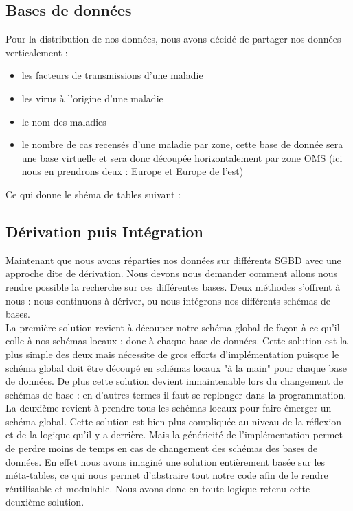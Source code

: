 \documentclass[12pt]{article}
\begin{document}
\subsection{Bases de données}

	Pour la distribution de nos données, nous avons décidé de partager nos données verticalement :\\
	\begin{itemize}
		\item les facteurs de transmissions d'une maladie\\
		\item les virus à l'origine d'une maladie\\
		\item le nom des maladies\\
		\item le nombre de cas recensés d'une maladie par zone, cette base de donnée sera une base virtuelle et sera donc découpée horizontalement par zone OMS (ici nous en prendrons deux : Europe et Europe de l'est)\\
	\end{itemize}
	Ce qui donne le shéma de tables suivant :

\subsection{Dérivation puis Intégration}

	Maintenant que nous avons réparties nos données sur différents SGBD avec une approche dite de dérivation. Nous devons nous demander comment allons nous rendre possible la recherche sur ces différentes bases. Deux méthodes s'offrent à nous : nous continuons à dériver, ou nous intégrons nos différents schémas de bases.\\
	\indent La première solution revient à découper notre schéma global de façon à ce qu'il colle à nos schémas locaux : donc à chaque base de données. Cette solution est la plus simple des deux mais nécessite de gros efforts d'implémentation puisque le schéma global doit être découpé en schémas locaux "à la main" pour chaque base de données. De plus cette solution devient inmaintenable lors du changement de schémas de base : en d'autres termes il faut se replonger dans la programmation.\\
	\indent La deuxième revient à prendre tous les schémas locaux pour faire émerger un schéma global. Cette solution est bien plus compliquée au niveau de la réflexion et de la logique qu'il y a derrière. Mais la généricité de l'implémentation permet de perdre moins de temps en cas de changement des schémas des bases de données. En effet nous avons imaginé une solution entièrement basée sur les méta-tables, ce qui nous permet d'abstraire tout notre code afin de le rendre réutilisable et modulable. Nous avons donc en toute logique retenu cette deuxième solution.\\
\end{document}
